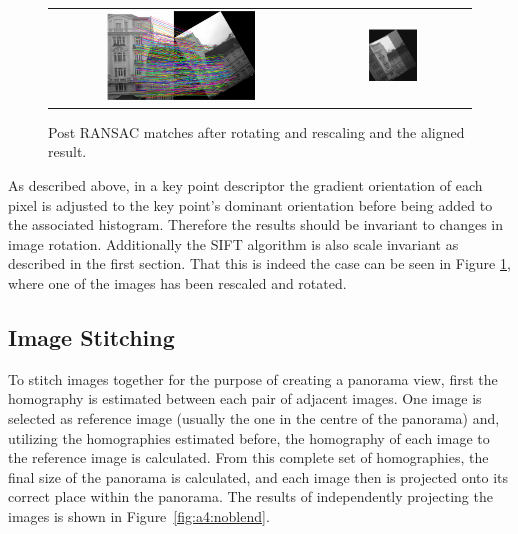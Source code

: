 \begin{figure}[h]
	\centering
	\begin{tabular}{cc}
	\includegraphics[width=0.59\textwidth]{figures/rotation_ransac.png} &
	\includegraphics[width=0.33\textwidth]{figures/rotation_overlay.png} 

	\end{tabular}
	\caption{Post RANSAC matches after rotating and rescaling and the aligned result.}
	\label{fig:a4:rotationscale}
\end{figure}

As described above, in a key point descriptor the gradient orientation of each pixel is adjusted to the key point's dominant orientation before being added to the associated histogram. Therefore the results should be invariant to changes in image rotation. Additionally the SIFT algorithm is also scale invariant as described in the first section. That this is indeed the case can be seen in Figure \ref{fig:a4:rotationscale}, where one of the images has been rescaled and rotated.

\FloatBarrier %

\subsection{Image Stitching}

To stitch images together for the purpose of creating a panorama view, first the homography is estimated between each pair of adjacent images. One image is selected as reference image (usually the one in the centre of the panorama) and, utilizing the homographies estimated before, the homography of each image to the reference image is calculated. From this complete set of homographies, the final size of the panorama is calculated, and each image then is projected onto its correct place within the panorama. The results of independently projecting the images is shown in Figure~\ref{fig:a4:noblend}.

